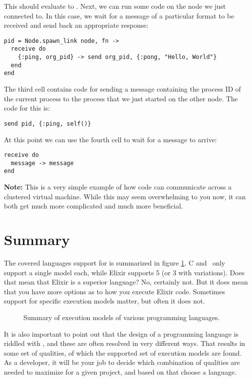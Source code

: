 This should evaluate to . Next, we can run some code on the node we just connected to. In this case, we wait for a message of a particular format to be received and send back an appropriate response:

\begin{verbatim}
pid = Node.spawn_link node, fn ->
  receive do
    {:ping, org_pid} -> send org_pid, {:pong, "Hello, World"}
  end
end
\end{verbatim}

The third cell contains code for sending a message containing the process ID of the current process to the process that we just started on the other node. The code for this is:

\begin{verbatim}
send pid, {:ping, self()}
\end{verbatim}

At this point we can use the fourth cell to wait for a message to arrive:

\begin{verbatim}
receive do
  message -> message
end
\end{verbatim}

\textbf{Note:} This is a very simple example of how code can communicate across a clustered virtual machine. While this may seem overwhelming to you now, it can both get much more complicated and much more beneficial.

\section{Summary}

The covered languages support for  is summarized in figure \ref{fig:first:phases:summary}. C and \csharp\ only support a single model each, while Elixir supports 5 (or 3 with variations). Does that mean that Elixir is a superior language? No, certainly not. But it does mean that you have more options as to how you execute Elixir code. Sometimes support for specific execution models matter, but often it does not.

\begin{figure}[tbp]
  
  \caption{Summary of execution models of various programming languages.}
  \label{fig:first:phases:summary}
\end{figure}

It is also important to point out that the design of a programming language is riddled with , and these are often resolved in very different ways. That results in some set of qualities, of which the supported set of execution models are found. As a developer, it will be your job to decide which combination of qualities are needed to maximize  for a given project, and based on that choose a language.


